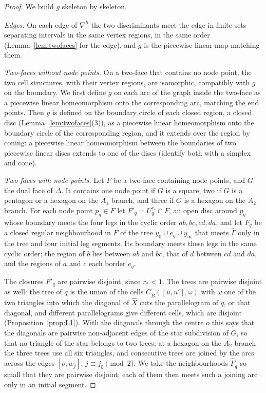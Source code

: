\begin{proof}
We build $g$ skeleton by skeleton.

\emph{Edges.} On each edge of $\nabla^{\check h}$ the two discriminants meet the edge in finite sets separating intervals in
the same vertex regions, in the same order (Lemma~\ref{lem:twofaces} for the edge), and $g$ is the piecewise linear map
matching them.

\emph{Two-faces without node points.} On a two-face that contains no node point, the two cell structures, with their vertex
regions, are isomorphic, compatibly with $g$ on the boundary. We first define $g$ on each arc of the graph inside the
two-face as a piecewise linear homeomorphism onto the corresponding arc, matching the end points. Then $g$ is defined on the
boundary circle of each closed region, a closed disc (Lemma~\ref{lem:twofaces}(3)), as a piecewise linear homeomorphism onto
the boundary circle of the corresponding region, and it extends over the region by coning: a piecewise linear homeomorphism
between the boundaries of two piecewise linear discs extends to one of the discs (identify both with a simplex and cone).

\emph{Two-faces with node points.} Let $F$ be a two-face containing node points, and $G$ the dual face of $\Delta$. It
contains one node point if $G$ is a square, two if $G$ is a pentagon or a hexagon on the $A_1$ branch, and three if $G$ is a
hexagon on the $A_2$ branch. For each node point $p_q\in F$ let $F'_q=U^{r_*}_q\cap F$, an open disc around $p_q$ whose
boundary meets the four legs in the cyclic order $ab,bc,cd,da$, and let $\widehat F_q$ be a closed regular neighbourhood in
$F$ of the tree $y_0\cup e_q\cup y_\infty$ that meets $\widehat\Gamma$ only in the tree and four initial leg segments. Its
boundary meets these legs in the same cyclic order; the region of $b$ lies between $ab$ and $bc$, that of $d$ between $cd$ and
$da$, and the regions of $a$ and $c$ each border $e_q$.

The closures $\overline{F'_q}$ are pairwise disjoint, since $r_*<1$. The trees are pairwise disjoint as well: the tree of $q$
is the union of the cells $C_{\widehat B}([u,u'],\omega)$ with $\omega$ one of the two triangles into which the diagonal of
$\widehat X$ cuts the parallelogram of $q$, or that diagonal, and different parallelograms give different cells, which are
disjoint (Proposition~\ref{prop:L1}). With the diagonals through the centre $o$ this says that the diagonals are pairwise
non-adjacent edges of the star subdivision of $G$, so that no triangle of the star belongs to two trees; at a hexagon on the
$A_2$ branch the three trees use all six triangles, and consecutive trees are joined by the arcs across the edges
$[o,w_j]$, $j\equiv j_0\pmod2$. We take the neighbourhoods $\widehat F_q$ so small that they are pairwise disjoint; each of them
then meets such a joining arc only in an initial segment.


\end{proof}
